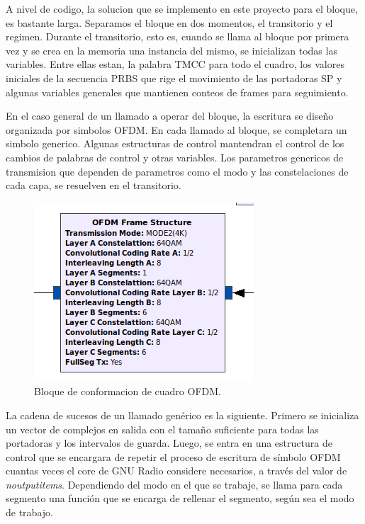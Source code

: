 A nivel de codigo, la solucion que se implemento en este proyecto para el bloque, es bastante larga. Separamos el bloque en dos momentos, el transitorio y el regimen. Durante el transitorio, esto es, cuando se llama al bloque por primera vez y se crea en la memoria una instancia del mismo, se inicializan todas las variables. Entre ellas estan, la palabra TMCC para todo el cuadro, los valores iniciales de la secuencia PRBS que rige el movimiento de las portadoras SP y algunas variables generales que mantienen conteos de frames para seguimiento. 

En el caso general de un llamado a operar del bloque, la escritura se diseño organizada por simbolos OFDM. En cada llamado al bloque, se completara un simbolo generico. Algunas estructuras de control mantendran el control de los cambios de palabras de control y otras variables. Los parametros genericos de transmision que dependen de parametros como el modo y las constelaciones de cada capa, se resuelven en el transitorio.

\begin{figure}[!h]
	\centering
	\includegraphics[scale=0.5]{figuras/cap05/bloque_ofdm}
	\caption{\label{f:bloque_ofdm} Bloque de conformacion de cuadro OFDM.}
\end{figure}

La cadena de sucesos de un llamado genérico es la siguiente. Primero se inicializa un vector de complejos en salida con el tamaño suficiente para todas las portadoras y los intervalos de guarda. Luego, se entra en una estructura de control que se encargara de  repetir el proceso de escritura de símbolo OFDM cuantas veces el core de GNU Radio considere necesarios, a través del valor de \textit{noutputitems}. Dependiendo del modo en el que se trabaje, se llama para cada segmento una función que se encarga de rellenar el segmento, según sea el modo de trabajo.

